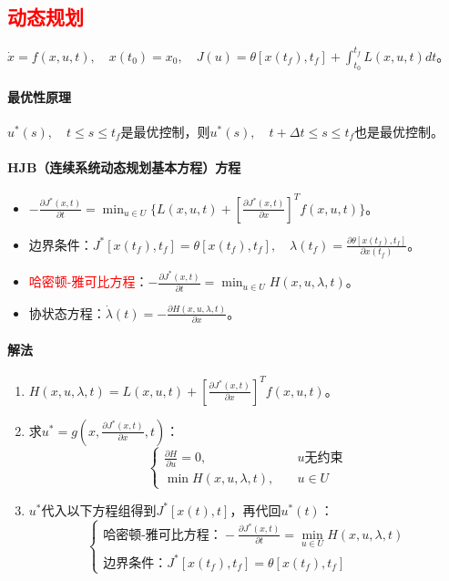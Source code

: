 \documentclass[
12pt, %
a4paper, 
oneside, %
]{scrartcl}
\begin{document}
\subsection[动态规划]{\textcolor{red}{动态规划}}
$ \dot{x} = f(x, u, t), \quad x(t_0) = x_0, \quad J(u) = \theta[x(t_f), t_f] + \int_{t_0}^{t_f} L(x, u, t) d t $。
\paragraph{最优性原理}
$ u^*(s), \quad t \leq s \leq t_f $是最优控制，则$ u^*(s), \quad t + \Delta t \leq s \leq t_f $也是最优控制。
\paragraph{HJB（连续系统动态规划基本方程）方程}
\begin{itemize}
\item $ -\frac{\partial J^*(x, t)}{\partial t} = \min_{u \in U} \{L(x, u, t) + [\frac{\partial J^*(x, t)}{\partial x}]^T f(x, u, t)\} $。
\item 边界条件：$ J^*[x(t_f), t_f] = \theta[x(t_f), t_f], \quad \lambda(t_f) = \frac{\partial \theta[x(t_f), t_f]}{\partial x(t_f)} $。
\item \textcolor{red}{哈密顿-雅可比方程}：$ -\frac{\partial J^*(x, t)}{\partial t} = \min_{u \in U} H(x, u, \lambda, t) $。
\item 协状态方程：$ \dot{\lambda}(t) = -\frac{\partial H(x, u, \lambda, t)}{\partial x} $。
\end{itemize}
\paragraph{解法}
\begin{enumerate}
\item $ H(x, u, \lambda, t) = L(x, u, t) + [\frac{\partial J^*(x, t)}{\partial x}]^T f(x, u, t) $。
\item 求$ u^* = g(x, \frac{\partial J^*(x, t)}{\partial x}, t) $：
$$ \begin{cases} \frac{\partial H}{\partial u} = 0, \quad& u \text{无约束} \\ \min H(x, u, \lambda, t), \quad& u \in U \end{cases} $$
\item $ u^* $代入以下方程组得到$ J^*[x(t), t] $，再代回$ u^*(t) $：
$$ \begin{cases} \text{哈密顿-雅可比方程：} -\frac{\partial J^*(x, t)}{\partial t} = \min_{u \in U} H(x, u, \lambda, t) \\ \text{边界条件：} J^*[x(t_f), t_f] = \theta[x(t_f), t_f] \end{cases} $$ 
\end{enumerate}
\end{document}
